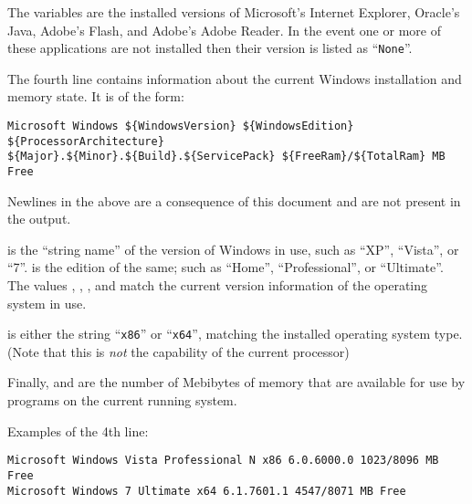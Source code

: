 The variables are the installed versions of Microsoft's Internet Explorer,
Oracle's Java, Adobe's Flash, and Adobe's Adobe Reader. In the event one or more
of these applications are not installed then their version is listed as
``\verb|None|''.

The fourth line contains information about the current Windows installation and
memory state. It is of the form:
\begin{verbatim}
Microsoft Windows ${WindowsVersion} ${WindowsEdition} ${ProcessorArchitecture}
${Major}.${Minor}.${Build}.${ServicePack} ${FreeRam}/${TotalRam} MB Free
\end{verbatim}

Newlines in the above are a consequence of this document and are not present in
the output.

 is the ``string name'' of the version of Windows in use,
such as ``XP'', ``Vista'', or ``7''.  is the edition of the
same; such as ``Home'', ``Professional'', or ``Ultimate''. The values
, , , and  match the current
version information of the operating system in use.

 is either the string ``\verb|x86|'' or
``\verb|x64|'', matching the installed operating system type. (Note that this is
\textit{not} the capability of the current processor)

Finally,  and  are the number of Mebibytes of memory
that are available for use by programs on the current running system.

Examples of the 4th line:
\begin{verbatim}
Microsoft Windows Vista Professional N x86 6.0.6000.0 1023/8096 MB Free
Microsoft Windows 7 Ultimate x64 6.1.7601.1 4547/8071 MB Free
\end{verbatim}

